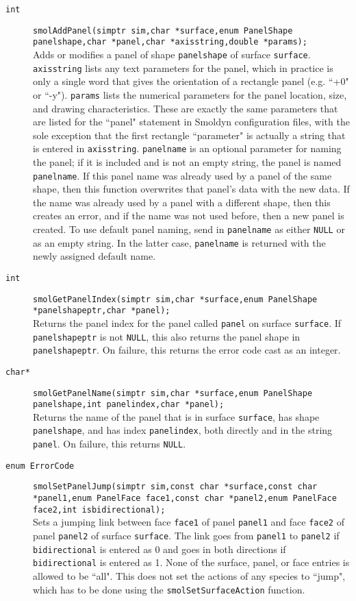 \documentclass {book}
\begin{document}
\begin{description}
\item[\texttt{int}]
\texttt{smolAddPanel(simptr sim,char *surface,enum PanelShape panelshape,char *panel,char *axisstring,double *params);}
\hfill \\
Adds or modifies a panel of shape \texttt{panelshape} of surface \texttt{surface}.  \texttt{axisstring} lists any text parameters for the panel, which in practice is only a single word that gives the orientation of a rectangle panel (e.g. ``+0" or ``-y").  \texttt{params} lists the numerical parameters for the panel location, size, and drawing characteristics.  These are exactly the same parameters that are listed for the ``panel" statement in Smoldyn configuration files, with the sole exception that the first rectangle ``parameter" is actually a string that is entered in \texttt{axisstring}.  \texttt{panelname} is an optional parameter for naming the panel; if it is included and is not an empty string, the panel is named \texttt{panelname}.  If this panel name was already used by a panel of the same shape, then this function overwrites that panel's data with the new data.  If the name was already used by a panel with a different shape, then this creates an error, and if the name was not used before, then a new panel is created.  To use default panel naming, send in \texttt{panelname} as either \texttt{NULL} or as an empty string.  In the latter case, \texttt{panelname} is returned with the newly assigned default name.

\item[\texttt{int}]
\texttt{smolGetPanelIndex(simptr sim,char *surface,enum PanelShape *panelshapeptr,char *panel);}
\hfill \\
Returns the panel index for the panel called \texttt{panel} on surface \texttt{surface}.  If \texttt{panelshapeptr} is not \texttt{NULL}, this also returns the panel shape in \texttt{panelshapeptr}.  On failure, this returns the error code cast as an integer.

\item[\texttt{char*}]
\texttt{smolGetPanelName(simptr sim,char *surface,enum PanelShape panelshape,int panelindex,char *panel);}
\hfill \\
Returns the name of the panel that is in surface \texttt{surface}, has shape \texttt{panelshape}, and has index \texttt{panelindex}, both directly and in the string \texttt{panel}.  On failure, this returns \texttt{NULL}.

\item[\texttt{enum ErrorCode}]
\texttt{smolSetPanelJump(simptr sim,const char *surface,const char *panel1,enum PanelFace face1,const char *panel2,enum PanelFace face2,int isbidirectional);}
\hfill \\
Sets a jumping link between face \texttt{face1} of panel \texttt{panel1} and face \texttt{face2} of panel \texttt{panel2} of surface \texttt{surface}.  The link goes from \texttt{panel1} to \texttt{panel2} if \texttt{bidirectional} is entered as 0 and goes in both directions if \texttt{bidirectional} is entered as 1.  None of the surface, panel, or face entries is allowed to be ``all".  This does not set the actions of any species to ``jump", which has to be done using the \texttt{smolSetSurfaceAction} function.


\end{description}
\end{document}
